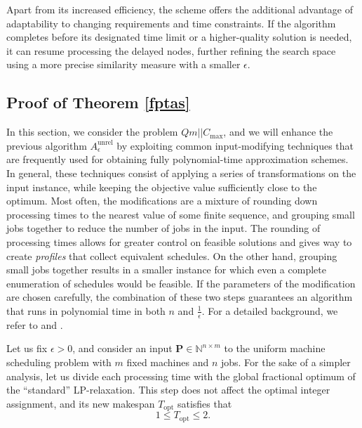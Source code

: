\documentclass[a4paper,UKenglish,cleveref, autoref, thm-restate, pdfa]{lipics-v2021}
\theoremstyle{plain}
\begin{document}
Apart from its increased efficiency, the scheme offers the additional advantage of adaptability to changing requirements and time constraints. If the algorithm completes before its designated time limit or a higher-quality solution is needed, it can resume processing the delayed nodes, further refining the search space using a more precise similarity measure with a smaller $\epsilon$.

 
\subsection{Proof of Theorem \ref{fptas}}\label{sec:js_fptas_proof}

In this section, we consider the problem $Qm||C_{\text{max}}$, and we will enhance the previous algorithm $A^{\text{unrel}}_{\epsilon}$ by exploiting common input-modifying techniques that are frequently used for obtaining fully polynomial-time approximation schemes. In general, these techniques consist of applying a series of transformations on the input instance, while keeping the objective value sufficiently close to the optimum. Most often, the modifications are a mixture of rounding down processing times to the nearest value of some finite sequence, and grouping small jobs together to reduce the number of jobs in the input. The rounding of processing times allows for greater control on feasible solutions and gives way to create \emph{profiles} that collect equivalent schedules. On the other hand, grouping small jobs together results in a smaller instance for which even a complete enumeration of schedules would be feasible. If the parameters of the modification are chosen carefully, the combination of these two steps guarantees an algorithm that runs in polynomial time in both $n$ and $\frac{1}{\epsilon}$. For a detailed background, we refer to \cite{grouping_1} and \cite{grouping_2}.

Let us fix $\epsilon > 0$, and consider an input $\bm{P} \in \mathbb{N}^{n \times m}$ to the uniform machine scheduling problem with $m$ fixed machines and $n$ jobs. For the sake of a simpler analysis, let us divide each processing time with the global fractional optimum of the ``standard'' LP-relaxation. This step does not affect the optimal integer assignment, and its new makespan $T_{\text{opt}}$ satisfies that 
\[
1 \le T_{\text{opt}} \le 2.
\]
\end{document}
